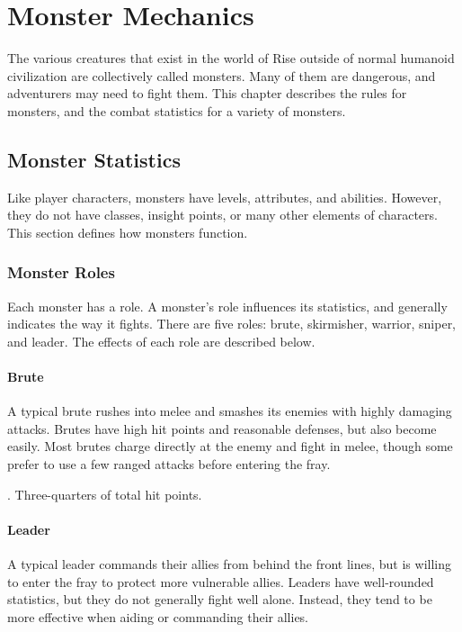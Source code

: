 \chapter{Monster Mechanics}

The various creatures that exist in the world of Rise outside of normal humanoid civilization are collectively called monsters.
Many of them are dangerous, and adventurers may need to fight them.
This chapter describes the rules for monsters, and the combat statistics for a variety of monsters.

\section{Monster Statistics}
  Like player characters, monsters have levels, attributes, and abilities.
  However, they do not have classes, insight points, or many other elements of characters.
  This section defines how monsters function.

  \subsection{Monster Roles}
    Each monster has a role.
    A monster's role influences its statistics, and generally indicates the way it fights.
    There are five roles: brute, skirmisher, warrior, sniper, and leader.
    The effects of each role are described below.

    \subsubsection{Brute}
      A typical brute rushes into melee and smashes its enemies with highly damaging attacks.
      Brutes have high hit points and reasonable defenses, but also become  easily.
      Most brutes charge directly at the enemy and fight in melee, though some prefer to use a few ranged attacks before entering the fray.

       .
       Three-quarters of total hit points.

    \subsubsection{Leader}
      A typical leader commands their allies from behind the front lines, but is willing to enter the fray to protect more vulnerable allies.
      Leaders have well-rounded statistics, but they do not generally fight well alone.
      Instead, they tend to be more effective when aiding or commanding their allies.

